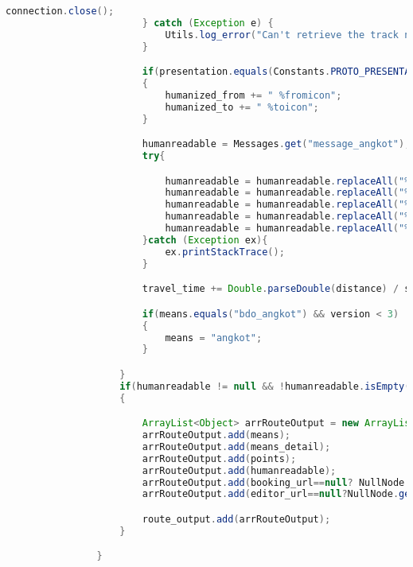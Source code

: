 \begin{lstlisting}[language=Java,basicstyle=\tiny,caption=Application.java]
                            connection.close();
                        } catch (Exception e) {
                            Utils.log_error("Can't retrieve the track name from database: " + e.getMessage());
                        }

                        if(presentation.equals(Constants.PROTO_PRESENTATION_MOBILE))
                        {
                            humanized_from += " %fromicon";
                            humanized_to += " %toicon";
                        }

                        humanreadable = Messages.get("message_angkot");
                        try{

                            humanreadable = humanreadable.replaceAll("%from",humanized_from);
                            humanreadable = humanreadable.replaceAll("%to",humanized_to);
                            humanreadable = humanreadable.replaceAll("%distance",format_distance(Double.parseDouble(distance),locale));
                            humanreadable = humanreadable.replaceAll("%trackname",readable_track_name);
                            humanreadable = humanreadable.replaceAll("%tracktype",track_type_name);
                        }catch (Exception ex){
                            ex.printStackTrace();
                        }

                        travel_time += Double.parseDouble(distance) / speed;

                        if(means.equals("bdo_angkot") && version < 3)
                        {
                            means = "angkot";
                        }

                    }
                    if(humanreadable != null && !humanreadable.isEmpty())
                    {

                        ArrayList<Object> arrRouteOutput = new ArrayList<Object>();
                        arrRouteOutput.add(means);
                        arrRouteOutput.add(means_detail);
                        arrRouteOutput.add(points);
                        arrRouteOutput.add(humanreadable);
                        arrRouteOutput.add(booking_url==null? NullNode.getInstance():booking_url);
                        arrRouteOutput.add(editor_url==null?NullNode.getInstance():editor_url);

                        route_output.add(arrRouteOutput);
                    }

                }


\end{lstlisting}
